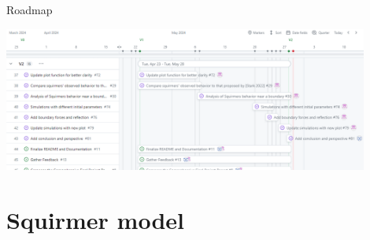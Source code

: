 \documentclass{beamer}
\begin{document}
\begin{frame}{Roadmap}
    \begin{center}
        \includegraphics[width=0.9\textwidth]{../images/roadmapV2.png}
    \end{center}
\end{frame}

\section{Squirmer model}
\end{document}
